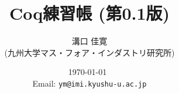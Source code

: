 \documentclass{jreport}
\begin{document}
\title{Coq練習帳 (第0.1版)}
\author{溝口 佳寛 \\ (九州大学マス・フォア・インダストリ研究所)}
\date{\today\ \now \\ Email: {\tt ym@imi.kyushu-u.ac.jp}}

\maketitle

\tableofcontents

  
  
  
  
\end{document}

